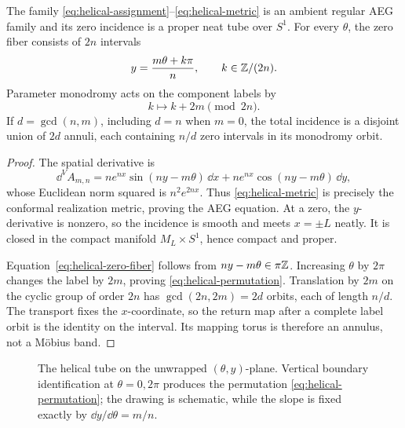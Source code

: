 \begin{theorem}
\label{thm:helical-zero-tube}
The family \eqref{eq:helical-assignment}--\eqref{eq:helical-metric} is an ambient
regular AEG family and its zero incidence is a proper neat tube over $S^1$.
For every $\theta$, the zero fiber consists of $2n$ intervals
\begin{equation}
 y=\frac{m\theta+k\pi}{n},
 \qquad k\in\mathbb{Z}/(2n).
 \label{eq:helical-zero-fiber}
\end{equation}
Parameter monodromy acts on the component labels by
\begin{equation}
 k\longmapsto k+2m\pmod{2n}.
 \label{eq:helical-permutation}
\end{equation}
If $d=\gcd(n,m)$, including $d=n$ when $m=0$, the total incidence is a disjoint
union of $2d$ annuli, each containing $n/d$ zero intervals in its monodromy orbit.
\end{theorem}

\begin{proof}
The spatial derivative is
\[
 \dd^VA_{m,n}
 =ne^{nx}\sin(ny-m\theta)\,\dd x
  +ne^{nx}\cos(ny-m\theta)\,\dd y,
\]
whose Euclidean norm squared is $n^2e^{2nx}$.  Thus
\eqref{eq:helical-metric} is precisely the conformal realization metric, proving
the AEG equation.  At a zero, the $y$-derivative is nonzero, so the incidence is
smooth and meets $x=\pm L$ neatly.  It is closed in the compact manifold
$M_L\times S^1$, hence compact and proper.

Equation~\eqref{eq:helical-zero-fiber} follows from $ny-m\theta\in\pi\mathbb{Z}$.
Increasing $\theta$ by $2\pi$ changes the label by $2m$, proving
\eqref{eq:helical-permutation}.  Translation by $2m$ on the cyclic group of order
$2n$ has $\gcd(2n,2m)=2d$ orbits, each of length $n/d$.  The transport fixes the
$x$-coordinate, so the return map after a complete label orbit is the identity on
the interval.  Its mapping torus is therefore an annulus, not a M\"obius band.
\end{proof}

\begin{figure}[ht]
\centering
{}
\caption{The helical tube on the unwrapped $(\theta,y)$-plane.  Vertical boundary
identification at $\theta=0,2\pi$ produces the permutation
\eqref{eq:helical-permutation}; the drawing is schematic, while the slope is fixed
exactly by $\dd y/\dd\theta=m/n$.}
\label{fig:helical-unwrapped}
\end{figure}

